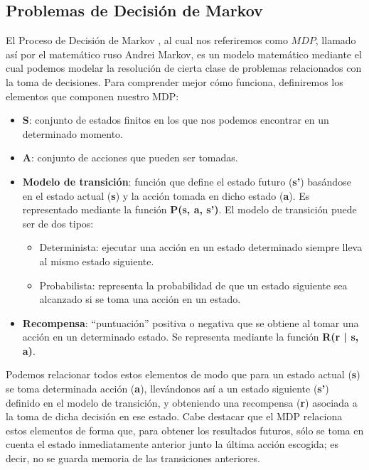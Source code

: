 \subsection{Problemas de Decisión de Markov}
\label{sec:mdp}

El Proceso de Decisión de Markov \citet{Puterman1994}, al cual nos referiremos como $MDP$,  llamado así por el matemático ruso Andrei Markov, es un modelo matemático mediante el cual podemos modelar la resolución de cierta clase de problemas relacionados con la toma de decisiones. Para comprender mejor cómo funciona, definiremos los elementos que componen nuestro MDP:

\begin{itemize}
    \item \textbf{S}: conjunto de estados finitos en los que nos podemos encontrar en un determinado momento.
    \item \textbf{A}: conjunto de acciones que pueden ser tomadas.
    \item \textbf{Modelo de transición}: función que define el estado futuro (\textbf{s'}) basándose en el estado actual (\textbf{s}) y la acción tomada en dicho estado (\textbf{a}). Es representado mediante la función \textbf{P(s, a, s’)}. El modelo de transición puede ser de dos tipos:
    \begin{itemize}
        \item Determinista: ejecutar una acción en un estado determinado siempre lleva al mismo estado siguiente.
        \item Probabilista: representa la probabilidad de que un estado siguiente sea alcanzado si se toma una acción en un estado.
    \end{itemize}
    \item \textbf{Recompensa}: “puntuación” positiva o negativa que se obtiene al tomar una acción en un determinado estado. Se representa mediante la función \textbf{R(r | s, a)}.
\end{itemize}

Podemos relacionar todos estos elementos de modo que para un estado actual (\textbf{s}) se toma determinada acción (\textbf{a}), llevándonos así a un estado siguiente (\textbf{s'}) definido en el modelo de transición, y obteniendo una recompensa (\textbf{r}) asociada a la toma de dicha decisión en ese estado. Cabe destacar que el MDP relaciona estos elementos de forma que, para obtener los resultados futuros, sólo se toma en cuenta el estado inmediatamente anterior junto la última acción escogida; es decir, no se guarda memoria de las transiciones anteriores. 

